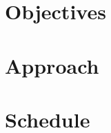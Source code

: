 \documentclass{article}
\begin{document}
\section{Objectives}


\section{Approach}
\section{Schedule}


\begin{comment}

The \texttt{A-Team} currently has a proposed solution, XXX. I am tasked with providing a competing solution, that can learn from more general corpus. This will allow us to compare results in a useful way.

\subsection{What is the status of related research by your mentor or group by the group that you will be joining?}
\subsection{What will be the contribution and significance of your effort?}

\section{Objectives}



\end{comment}
\end{document}
